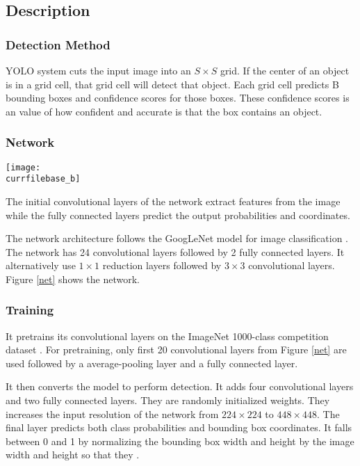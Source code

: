 \documentclass[catalog.tex]{subfiles}
\begin{document}
\subsection*{Description}
\subsubsection{Detection Method}
YOLO system cuts the input image into an $S\times S$ grid. 
If the center of an object is in a grid cell, that grid cell will detect that object.
Each grid cell predicts B bounding boxes and confidence
scores for those boxes. 
These confidence scores is an value of how confident and accurate is that the box contains an object.
\subsubsection{Network}
\begin{figure*}[t]
      \centering
        \texttt{[image: \\currfilebase\_b]}
      \caption{\small \textbf{The Architecture.} The detection network has 24 convolutional layers and 2 following fully connected layers. To be noted that $1 \times 1$ convolutional layers are alternated.}
      \label{net}
   \end{figure*}
The initial convolutional layers of the network extract features from the image while the fully connected layers predict the output probabilities and coordinates.

The network architecture follows the GoogLeNet model for image classification \cite{szegedy2015going}. The network has 24 convolutional layers followed by 2 fully connected layers. It alternatively use $1 \times 1$ reduction layers followed by $3 \times 3$ convolutional layers. Figure \ref{net} shows the network.

\subsubsection{Training}
It pretrains its convolutional layers on the ImageNet 1000-class competition dataset \cite{russakovsky2015imagenet}. For pretraining, only first 20 convolutional layers from Figure \ref{net} are used followed by a average-pooling layer and a fully connected layer. 

\smallskip
It then converts the model to perform detection. It adds four convolutional layers and two fully connected layers. They are randomly initialized weights. They increases the input resolution of the network from $224 \times 224$ to $448 \times 448$.
The final layer predicts both class probabilities and bounding box coordinates. It falls between 0 and 1 by normalizing the bounding box width and height by the image width and height so that they . 
\end{document}

